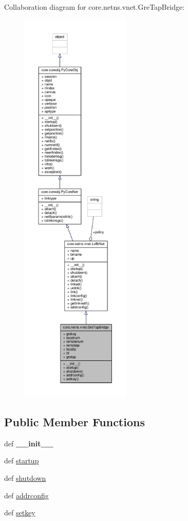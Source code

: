 Collaboration diagram for core.\+netns.\+vnet.\+Gre\+Tap\+Bridge\+:
\nopagebreak
\begin{figure}[H]
\begin{center}
\leavevmode
\includegraphics[height=550pt]{classcore_1_1netns_1_1vnet_1_1_gre_tap_bridge__coll__graph}
\end{center}
\end{figure}
\subsection*{Public Member Functions}
\begin{DoxyCompactItemize}
\item 
\hypertarget{classcore_1_1netns_1_1vnet_1_1_gre_tap_bridge_a856b71453e44a70ee53413ad7a1c8a86}{def {\bfseries \+\_\+\+\_\+init\+\_\+\+\_\+}}\label{classcore_1_1netns_1_1vnet_1_1_gre_tap_bridge_a856b71453e44a70ee53413ad7a1c8a86}

\item 
def \hyperlink{classcore_1_1netns_1_1vnet_1_1_gre_tap_bridge_a828fce345e618ca3c85913e919356860}{startup}
\item 
def \hyperlink{classcore_1_1netns_1_1vnet_1_1_gre_tap_bridge_aa5012962a70ee6428a72acb91dc5fac9}{shutdown}
\item 
def \hyperlink{classcore_1_1netns_1_1vnet_1_1_gre_tap_bridge_a8d1ad6a46f8e0bd3908c4fdc1085842a}{addrconfig}
\item 
def \hyperlink{classcore_1_1netns_1_1vnet_1_1_gre_tap_bridge_ae4d5476a3236b0c4d369e4c732181762}{setkey}
\end{DoxyCompactItemize}
